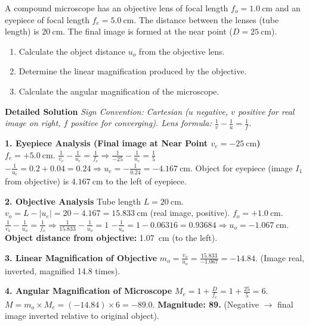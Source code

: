\documentclass[11pt]{article}
\begin{document}
\begin{exoresolu}
A compound microscope has an objective lens of focal length $f_o = 1.0\ \mathrm{cm}$ and an eyepiece of focal length $f_e = 5.0\ \mathrm{cm}$. The distance between the lenses (tube length) is $20\ \mathrm{cm}$. The final image is formed at the near point ($D = 25\ \mathrm{cm}$).
\begin{enumerate}
\item Calculate the object distance $u_o$ from the objective lens.
\item Determine the linear magnification produced by the objective.
\item Calculate the angular magnification of the microscope.
\end{enumerate}
\tcblower
\textbf{Detailed Solution}
\textit{Sign Convention: Cartesian ($u$ negative, $v$ positive for real image on right, $f$ positive for converging). Lens formula: $\frac{1}{v} - \frac{1}{u} = \frac{1}{f}$.}

\textbf{1. Eyepiece Analysis (Final image at Near Point $v_e = -25\ \mathrm{cm}$)}
$f_e = +5.0\ \mathrm{cm}$.
$\frac{1}{v_e} - \frac{1}{u_e} = \frac{1}{f_e} \Rightarrow \frac{1}{-25} - \frac{1}{u_e} = \frac{1}{5}$
$-\frac{1}{u_e} = 0.2 + 0.04 = 0.24 \Rightarrow u_e = -\frac{1}{0.24} = -4.167\ \mathrm{cm}$.
Object for eyepiece (image $I_1$ from objective) is $4.167\ \mathrm{cm}$ to the left of eyepiece.

\textbf{2. Objective Analysis}
Tube length $L = 20\ \mathrm{cm}$.
$v_o = L - |u_e| = 20 - 4.167 = 15.833\ \mathrm{cm}$ (real image, positive).
$f_o = +1.0\ \mathrm{cm}$.
$\frac{1}{v_o} - \frac{1}{u_o} = \frac{1}{f_o} \Rightarrow \frac{1}{15.833} - \frac{1}{u_o} = 1$
$-\frac{1}{u_o} = 1 - 0.06316 = 0.93684 \Rightarrow u_o = -1.067\ \mathrm{cm}$.
\textbf{Object distance from objective:} \SI{1.07}{cm} (to the left).

\textbf{3. Linear Magnification of Objective}
$m_o = \frac{v_o}{u_o} = \frac{15.833}{-1.067} = -14.84$.
(Image real, inverted, magnified 14.8 times).

\textbf{4. Angular Magnification of Microscope}
$M_e = 1 + \frac{D}{f_e} = 1 + \frac{25}{5} = 6$.
$M = m_o \times M_e = (-14.84) \times 6 = -89.0$.
\textbf{Magnitude: 89.} (Negative $\rightarrow$ final image inverted relative to original object).
\end{exoresolu}
\end{document}
